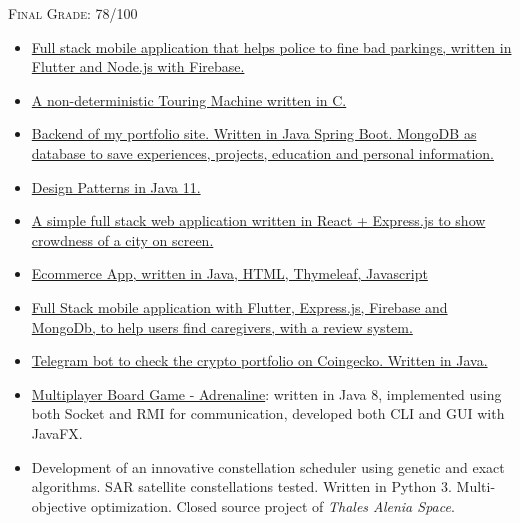 \documentclass[10pt,a4paper]{altacv}
\begin{document}
\textsc{Final Grade}: 78/100

 \divider


\begin{itemize}
\item \href{https://github.com/fedy97/SafeStreets-Frontend-Flutter}{Full stack mobile application that helps police to fine bad parkings, written in Flutter and Node.js with Firebase.}
\item \href{https://github.com/fedy97/Progetto-Api-2018-Polimi}{A non-deterministic Touring Machine written in C.}
\item \href{https://github.com/fedy97/backend-portfolio}{Backend of my portfolio site. Written in Java Spring Boot. MongoDB as database to save experiences, projects, education and personal information.}
\item \href{https://github.com/fedy97/Design-Patterns}{Design Patterns in Java 11.}
\item \href{https://github.com/fedy97/digital-innovation-lab-2020}{A simple full stack web application written in React + Express.js to show crowdness of a city on screen.}
\item \href{https://github.com/fedy97/TIW_HTML-2020-2021}{Ecommerce App, written in Java, HTML, Thymeleaf, Javascript}
\item \href{https://github.com/fedy97/Baddy-full-stack-app}{Full Stack mobile application with Flutter, Express.js, Firebase and MongoDb, to help users find caregivers, with a review system.}
\item \href{https://github.com/fedy97/telegram-crypto-bot}{Telegram bot to check the crypto portfolio on Coingecko. Written in Java.}
\item \href{https://github.com/fedy97/ing-sw-2019-morreale-marini-orlando}{Multiplayer Board Game - Adrenaline}: written in Java 8, implemented using both Socket and RMI for communication, developed both CLI and GUI with JavaFX.
\item Development of an innovative constellation scheduler using genetic and exact algorithms. SAR satellite constellations tested. Written in Python 3. Multi-objective optimization. Closed source project of \textit{Thales Alenia Space}.
\end{itemize}


\clearpage
\end{document}
